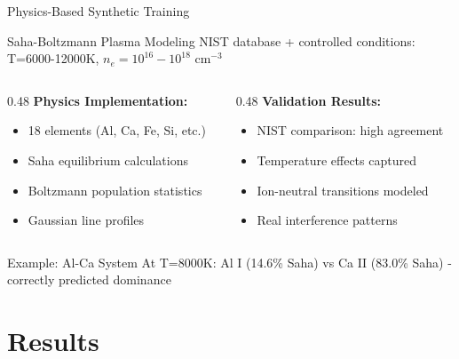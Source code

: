 \documentclass{beamer}
\begin{document}
\begin{frame}{Physics-Based Synthetic Training}
  \begin{block}{Saha-Boltzmann Plasma Modeling}
    NIST database + controlled conditions: T=6000-12000K, $n_e=10^{16}-10^{18}$ cm$^{-3}$
  \end{block}
  
  \begin{columns}[T]
    \begin{column}{0.48\textwidth}
      \textbf{Physics Implementation:}
      \begin{itemize}
        \item 18 elements (Al, Ca, Fe, Si, etc.)
        \item Saha equilibrium calculations
        \item Boltzmann population statistics
        \item Gaussian line profiles
      \end{itemize}
    \end{column}
    \begin{column}{0.48\textwidth}
      \textbf{Validation Results:}
      \begin{itemize}
        \item NIST comparison: high agreement
        \item Temperature effects captured
        \item Ion-neutral transitions modeled
        \item Real interference patterns
      \end{itemize}
    \end{column}
  \end{columns}
  
  \vspace{1em}
  \begin{exampleblock}{Example: Al-Ca System}
    At T=8000K: Al I (14.6\% Saha) vs Ca II (83.0\% Saha) - correctly predicted dominance
  \end{exampleblock}
\end{frame}

\section{Results}
\end{document}
